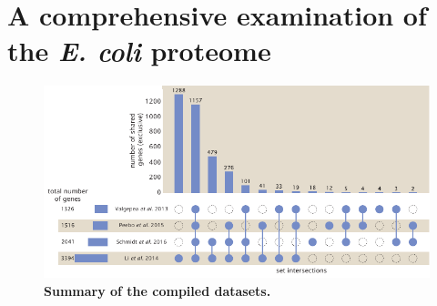 \section{A comprehensive examination of the \textit{E. coli} proteome}


\begin{figure}
{  \centering 
\includegraphics{../../figures/dataset_upset_diagram.pdf}
\caption{\textbf{Summary of the compiled datasets.}}

}
\label{fig:datset_intersections}
\end{figure}

